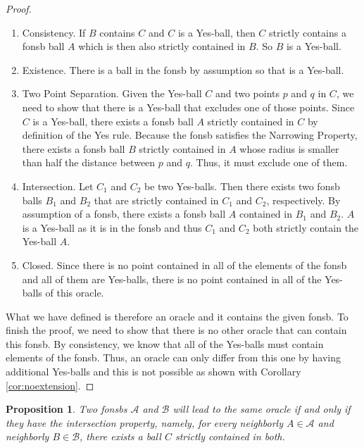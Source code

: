 \documentclass[12pt]{article}
\newtheorem{proposition}{Proposition}[section]
\begin{document}
\begin{proof}
    \begin{enumerate}
        \item Consistency. If $B$ contains $C$ and $C$ is a Yes-ball, then $C$ strictly contains a fonsb ball $A$ which is then also strictly contained in $B$. So $B$ is a Yes-ball.
        \item Existence. There is a ball in the fonsb by assumption so that is a Yes-ball. 
        \item Two Point Separation. Given the Yes-ball $C$ and two points $p$ and $q$ in $C$, we need to show that there is a Yes-ball that excludes one of those points. Since $C$ is a Yes-ball, there exists a fonsb ball $A$ strictly contained in $C$ by definition of the Yes rule. Because the fonsb satisfies the Narrowing Property, there exists a fonsb ball $B$ strictly contained in $A$ whose radius is smaller than half the distance between $p$ and $q$. Thus, it must exclude one of them. 
        \item Intersection. Let $C_1$ and $C_2$ be two Yes-balls. Then there exists two fonsb balls $B_1$ and $B_2$ that are strictly contained in $C_1$ and $C_2$, respectively. By assumption of a fonsb, there exists a fonsb ball $A$ contained in $B_1$ and $B_2$. $A$ is a Yes-ball as it is in the fonsb and thus $C_1$ and $C_2$ both strictly contain the Yes-ball $A$.
        \item Closed. Since there is no point contained in all of the elements of the fonsb and all of them are Yes-balls, there is no point contained in all of the Yes-balls of this oracle. 
    \end{enumerate}

    What we have defined is therefore an oracle and it contains the given fonsb. To finish the proof, we need to show that there is no other oracle that can contain this fonsb. By consistency, we know that all of the Yes-balls must contain elements of the fonsb. Thus, an oracle can only differ from this one by having additional Yes-balls and this is not possible as shown with Corollary \ref{cor:noextension}.
    
\end{proof}


\begin{proposition}
    Two fonsbs $\mathcal{A}$ and $\mathcal{B}$ will lead to the same oracle if and only if they have the intersection property, namely, for every neighborly $A \in \mathcal{A}$ and neighborly $B \in \mathcal{B}$, there exists a ball $C$ strictly contained in both. 
\end{proposition}
\end{document}
